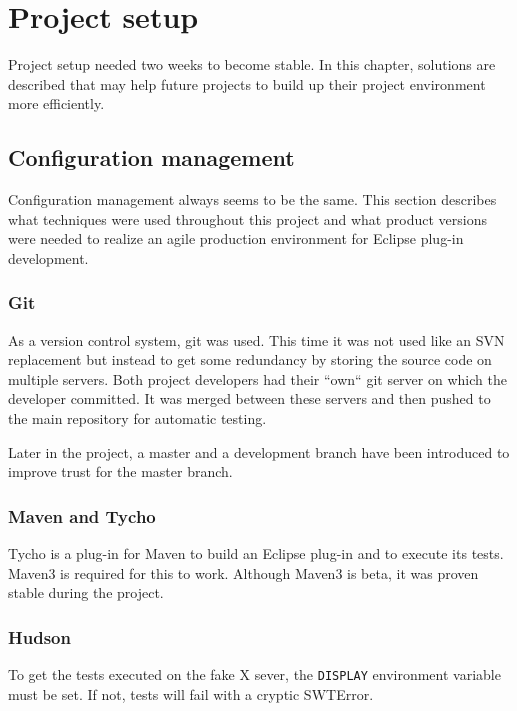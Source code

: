 \chapter{Project setup}
\thispagestyle{fancy}

Project setup needed two weeks to become stable. In this chapter, solutions are 
described that may help future projects to build up their project environment 
more efficiently.

\section{Configuration management}

Configuration management always seems to be the same. This section describes 
what techniques were used throughout this project and what product versions were 
needed to realize an agile production environment for Eclipse plug-in development.

\subsection{Git}

As a version control system, git was used. This time it was not used like an SVN
replacement but instead to get some redundancy by storing the source code on
multiple servers. Both project developers had their ``own`` git server on which
the developer committed. It was merged between these servers and then pushed to
the main repository for automatic testing.

Later in the project, a master and a development branch have been introduced to 
improve trust for the master branch.

\subsection{Maven and Tycho}

Tycho is a plug-in for Maven to build an Eclipse plug-in and to execute its tests.
Maven3 is required for this to work. Although Maven3 is beta, it was proven
stable during the project.

\subsection{Hudson}

To get the tests executed on the fake X sever, the \texttt{DISPLAY} environment
variable must be set. If not, tests will fail with a cryptic
SWTError.

